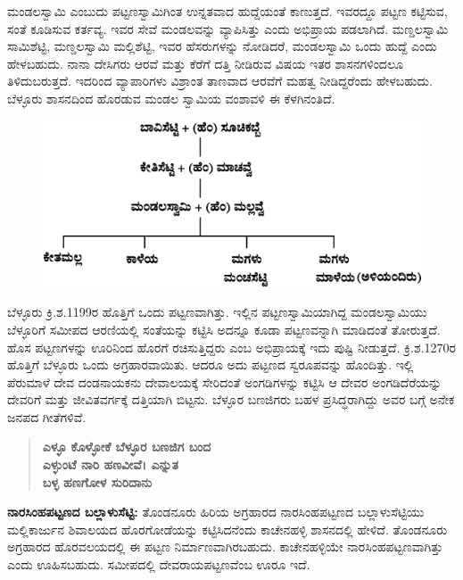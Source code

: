 ಮಂಡಲಸ್ವಾಮಿ ಎಂಬುದು ಪಟ್ಟಣಸ್ವಾಮಿಗಿಂತ ಉನ್ನತವಾದ ಹುದ್ದೆಯಂತೆ ಕಾಣುತ್ತದೆ. ಇವರದ್ದೂ ಪಟ್ಟಣ ಕಟ್ಟಿಸುವ, ಸಂತೆ ಕೂಡಿಸುವ ಕರ್ತವ್ಯ. ಇವರ ಸೇವೆ ಮಂಡಲವನ್ನು ವ್ಯಾಪಿಸಿತ್ತು ಎಂದು ಅಭಿಪ್ರಾಯ ಪಡಲಾಗಿದೆ. ಮಣ್ಡಲಸ್ವಾಮಿ ಸಾಮಿಶೆಟ್ಟಿ, ಮಣ್ಡಲಸ್ವಾಮಿ ಮಲ್ಲಿಶೆಟ್ಟಿ, ಇವರ ಹೆಸರುಗಳನ್ನು ನೋಡಿದರೆ, ಮಂಡಲಸ್ವಾಮಿ ಒಂದು ಹುದ್ದೆ ಎಂದು ಹೇಳಬಹುದು. ನಾನಾ ದೇಸಿಗರು ಆರವೆ ಮತ್ತು ಕೆರೆಗೆ ದತ್ತಿ ನೀಡಿರುವ ವಿಷಯ ಇತರ ಶಾಸನಗಳಿಂದಲೂ ತಿಳಿದುಬರುತ್ತದೆ. ಇದರಿಂದ ವ್ಯಾಪಾರಿಗಳು ವಿಶ್ರಾಂತ ತಾಣವಾದ ಆರವೆಗೆ ಮಹತ್ವ ನೀಡಿದ್ದರೆಂದು ಹೇಳಬಹುದು. ಬೆಳ್ಳೂರು ಶಾಸನದಿಂದ ಹೊರಡುವ ಮಂಡಲ ಸ್ವಾಮಿಯ ವಂಶಾವಳಿ ಈ ಕೆಳಗಿನಂತಿದೆ.

\begin{figure}[!h]
\includegraphics{images/chap8/chap8fig2.jpeg}
\end{figure}

ಬೆಳ್ಳೂರು ಕ್ರಿ.ಶ.1199ರ ಹೊತ್ತಿಗೆ ಒಂದು ಪಟ್ಟಣವಾಗಿತ್ತು. ಇಲ್ಲಿನ ಪಟ್ಟಣಸ್ವಾಮಿಯಾಗಿದ್ದ ಮಂಡಲಸ್ವಾಮಿಯು ಬೆಳ್ಳೂರಿಗೆ ಸಮೀಪದ ಆರಣಿಯಲ್ಲಿ ಸಂತೆಯನ್ನು ಕಟ್ಟಿಸಿ ಅದನ್ನೂ ಕೂಡಾ ಪಟ್ಟಣವನ್ನಾಗಿ ಮಾಡಿದಂತೆ ತೋರುತ್ತದೆ. ಹೊಸ ಪಟ್ಟಣಗಳನ್ನು ಊರಿನಿಂದ ಹೊರಗೆ ರಚಿಸುತ್ತಿದ್ದರು ಎಂಬ ಅಭಿಪ್ರಾಯಕ್ಕೆ ಇದು ಪುಷ್ಟಿ ನೀಡುತ್ತದೆ. ಕ್ರಿ.ಶ.1270ರ ಹೊತ್ತಿಗೆ ಬೆಳ್ಳೂರು ಒಂದು ಅಗ್ರಹಾರವಾಯಿತು. ಆದರೂ ಅದು ಪಟ್ಟಣದ ಸ್ವರೂಪವನ್ನು ಹೊಂದಿತ್ತು. ಇಲ್ಲಿ ಪೆರುಮಾಳೆ ದೇವ ದಂಡನಾಯಕನು ದೇವಾಲಯಕ್ಕೆ ಸೇರಿದಂತೆ ಅಂಗಡಿಗಳನ್ನು ಕಟ್ಟಿಸಿ ಆ ದೇವರ ಅಂಗಡಿದೆರೆಯನ್ನು ದೇವರಿಗೆ ಮತ್ತು ಜೀವಿತವರ್ಗಕ್ಕೆ ದತ್ತಿಯಾಗಿ ಬಿಟ್ಟನು. ಬೆಳ್ಳೂರ ಬಣಜಿಗರು ಬಹಳ ಪ್ರಸಿದ್ಧರಾಗಿದ್ದು ಅವರ ಬಗ್ಗೆ ಅನೇಕ ಜನಪದ ಗೀತೆಗಳಿವೆ.

\begin{verse}
\textbf{ಎಳ್ಳೂ ಕೊಳ್ಳೋಕೆ ಬೆಳ್ಳೂರ ಬಣಜಿಗ ಬಂದ} \\\textbf{ಎಳ್ಳುಂಟೆ ನಾರಿ ಹಣವೀವೆ। ಎನ್ನುತ} \\\textbf{ಬಳ್ಳ ಹಣಗೋಳ ಸುರಿದಾನು}
\end{verse}

\textbf{ನಾರಸಿಂಹಪಟ್ಟಣದ ಬಲ್ಲಾಳುಸೆಟ್ಟಿ: } ತೊಂಡನೂರು ಹಿರಿಯ ಅಗ್ರಹಾರದ ನಾರಸಿಂಹಪಟ್ಟಣದ ಬಲ್ಲಾಳುಸೆಟ್ಟಿಯು ಮಲ್ಲಿಕಾರ್ಜುನ ಶಿವಾಲಯದ ಹೊರಗೋಡೆಯನ್ನು ಕಟ್ಟಿಸಿದನೆಂದು ಕಾಚೇನಹಳ್ಳಿ ಶಾಸನದಲ್ಲಿ ಹೇಳಿದೆ. ತೊಂಡನೂರು ಅಗ್ರಹಾರದ ಹೊರವಲಯದಲ್ಲಿ ಈ ಪಟ್ಟಣ ನಿರ್ಮಾಣವಾಗಿರಬಹುದು. ಕಾಚೇನಹಳ್ಳಿಯೇ ನಾರಸಿಂಹಪಟ್ಟಣವಾಗಿತ್ತು ಎಂದು ಊಹಿಸಬಹುದು. ಸಮೀಪದಲ್ಲಿ ದೇವರಾಯಪಟ್ಟಣವೆಂಬ ಊರೂ ಇದೆ.

